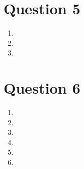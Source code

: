 \documentclass[a4paper, fleqn]{article}
\begin{document}
\section{Question 5}
\begin{enumerate}[label=(\alph{*})]
\item
\item 
\item 
\end{enumerate}
\section{Question 6}
\begin{enumerate}[label=(\alph{*})]
\item 
\item 
\item 
\item 
\item 
\item 
\end{enumerate}
\end{document}
